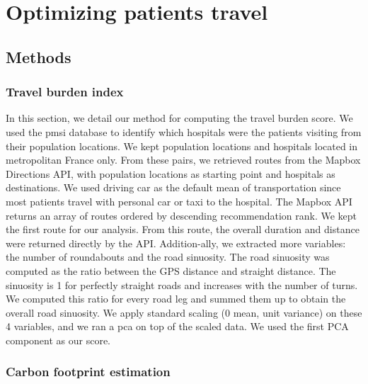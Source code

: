 \chapter{Optimizing patients travel}

\section{Methods}

\subsection{Travel burden index}

In this section, we detail our method for computing the travel burden score. We
used the \ac{pmsi} database to identify which hospitals were the patients
visiting from their population locations. We kept population locations and
hospitals located in metropolitan France only. From these pairs, we retrieved
routes from the Mapbox Directions API, with population locations as starting
point and hospitals as destinations.  We used driving car as the default mean of
transportation since most patients travel with personal car or taxi to the
hospital. The Mapbox API returns an array of routes ordered by descending
recommendation rank. We kept the first route for our analysis. From this route,
the overall duration and distance were returned directly by the API.
Addition-ally, we extracted more variables: the number of roundabouts and the
road sinuosity. The road sinuosity was computed as the ratio between the GPS
distance and straight distance. The sinuosity is 1 for perfectly straight roads
and increases with the number of turns. We computed this ratio for every road
leg and summed them up to obtain the overall road sinuosity. We apply standard
scaling (0 mean, unit variance) on these 4 variables, and we ran a \ac{pca} on
top of the scaled data. We used the first PCA component as our score.

\subsection{Carbon footprint estimation}

